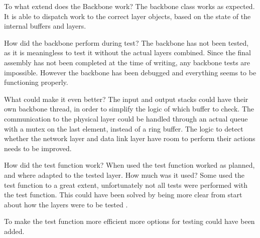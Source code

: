 To what extend does the Backbone work? 
The backbone class works as expected. It is able to dispatch work to the correct layer objects, based on the state of the internal buffers and layers.

How did the backbone perform during test?
The backbone has not been tested, as it is meaningless to test it without the actual layers combined. Since the final assembly has not been completed at the time of writing, any backbone tests are impossible. However the backbone has been debugged and everything seems to be functioning properly.

What could make it even better?
The input and output stacks could have their own backbone thread, in order to simplify the logic of which buffer to check.
The communication to the physical layer could be handled through an actual queue with a mutex on the last element, instead of a ring buffer. The logic to detect whether the network layer and data link layer have room to perform their actions needs to be improved.


How did the test function work?
When used the test function worked as planned, and where adapted to the tested layer. 
How much was it used?
Some used the test function to a great extent, unfortunately not all tests were performed with the test function. This could have been solved by being more clear from start about how the layers were to be tested . 

To make the test function more efficient more options for testing could have been added.
